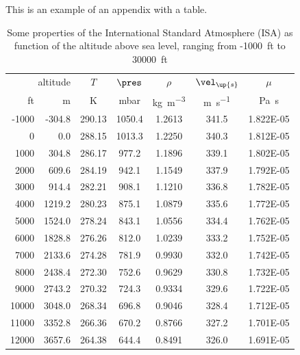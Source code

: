 \label{ch:isa}
\begin{explanation}
This is an example of an appendix with a table.
\end{explanation}

\begin{table}[ht!]\centering
	\caption{Some properties of the International Standard Atmosphere (ISA) as function of the altitude above sea level, ranging from -1000~ft to 30000~ft}\label{tab:isa}
	\begin{tabular}{rrccccc}
		\toprule
		\multicolumn{2}{r}{altitude} &  $T$ & $\pres$ &   $\rho$ &  $\vel_\up{s}$ &  $\mu$ \\[+1.5ex] %
		ft   & m    &  K    &  mbar  & \unit{\kg\per\cubic\m} &  \unit{\m\per\s} &  \unit{\Pa\s} \\ [+1.5ex] 
        	-1000	&	-304.8	&	290.13	&	1050.4	&	1.2613	&	341.5	&	\num{1.822E-05}	\\
        	0	    &	0.0	    &	288.15	&	1013.3	&	1.2250	&	340.3	&	\num{1.812E-05}	\\
        	1000	&	304.8	&	286.17	&	977.2	&	1.1896	&	339.1	&	\num{1.802E-05}	\\
        	2000	&	609.6	&	284.19	&	942.1	&	1.1549	&	337.9	&	\num{1.792E-05}	\\
        	3000	&	914.4	&	282.21	&	908.1	&	1.1210	&	336.8	&	\num{1.782E-05}	\\
        	4000	&	1219.2	&	280.23	&	875.1	&	1.0879	&	335.6	&	\num{1.772E-05}	\\
        	5000	&	1524.0	&	278.24	&	843.1	&	1.0556	&	334.4	&	\num{1.762E-05}	\\
        	6000	&	1828.8	&	276.26	&	812.0	&	1.0239	&	333.2	&	\num{1.752E-05}	\\
        	7000	&	2133.6	&	274.28	&	781.9	&	0.9930	&	332.0	&	\num{1.742E-05}	\\
        	8000	&	2438.4	&	272.30	&	752.6	&	0.9629	&	330.8	&	\num{1.732E-05}	\\
        	9000	&	2743.2	&	270.32	&	724.3	&	0.9334	&	329.6	&	\num{1.722E-05}	\\
        	10000	&	3048.0	&	268.34	&	696.8	&	0.9046	&	328.4	&	\num{1.712E-05}	\\
        	11000	&	3352.8	&	266.36	&	670.2	&	0.8766	&	327.2	&	\num{1.701E-05}	\\
        	12000	&	3657.6	&	264.38	&	644.4	&	0.8491	&	326.0	&	\num{1.691E-05}	\\

\end{tabular}
\end{table}

